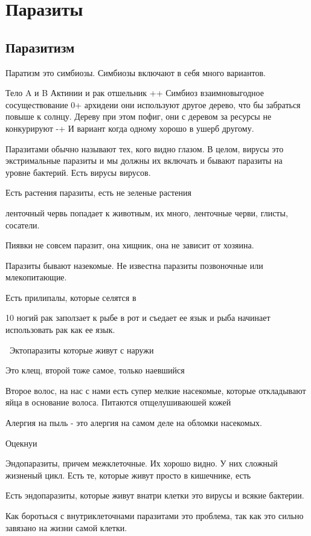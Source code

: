 ﻿\section{Паразиты}
\subsection{Паразитизм}
Паратизм это симбиозы. Симбиозы включают 
в себя много вариантов. 

Тело A и B
Актинии и рак отшельник ++
Симбиоз взаимновыгодное сосуществование
0+ архидеии они используют другое дерево, что бы 
забраться повыше к солнцу. Дереву при этом пофиг, 
они с деревом за ресурсы не конкурируют
-+ И вариант когда одному хорошо в ушерб другому. 

Паразитами обычно называют тех, кого видно глазом. 
В целом, вирусы это экстримальные паразиты и мы должны
их включать и бывают паразиты на уровне бактерий. Есть вирусы вирусов. 

Есть растения паразиты, есть не зеленые растения 

ленточный червь попадает к животным, их много, 
ленточные черви, глисты, сосатели. 

Пиявки не совсем паразит, она хищник, она не зависит от хозяина. 


Паразиты бывают назекомые. Не известна паразиты позвоночные или 
млекопитающие. 

Есть прилипалы, которые селятся в 


10 ногий рак заползает к рыбе в рот и съедает ее язык и рыба начинает использовать 
рак как ее язык. 

\
Эктопаразиты которые живут с наружи

Это клещ, второй тоже  самое, только наевшийся


Второе волос, на нас с нами есть супер мелкие насекомые, 
которые откладывают яйца в основание волоса. Питаются отщелушиваюшей кожей

Алергия на пыль - это алергия на самом деле на 
обломки насекомых.

Оцекнуи 

Эндопаразиты,
причем межклеточные. Их хорошо видно. У них 
сложный жизненый цикл. Есть те, которые живут просто в кишечнике, 
есть

Есть эндопаразиты, которые живут внатри клетки это вирусы и всякие бактерии. 

Как боротьься с внутриклеточнами паразитами это проблема, так как 
это сильно завязано на жизни самой клетки. 


